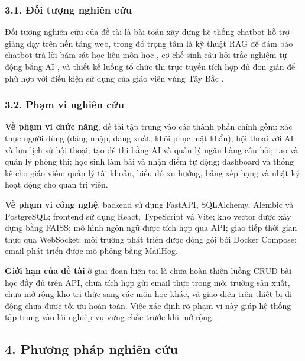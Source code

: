 \documentclass[12pt,a4paper]{article}
\begin{document}
	\subsubsection*{3.1. Đối tượng nghiên cứu}
	
	Đối tượng nghiên cứu của đề tài là bài toán xây dựng hệ thống chatbot hỗ trợ giảng dạy trên nền tảng web, trong đó trọng tâm là kỹ thuật RAG để đảm bảo chatbot trả lời bám sát học liệu môn học \cite{lewis2020rag}, cơ chế sinh câu hỏi trắc nghiệm tự động bằng AI \cite{kurdi2020qg}, và thiết kế luồng tổ chức thi trực tuyến tích hợp đủ đơn giản để phù hợp với điều kiện sử dụng của giáo viên vùng Tây Bắc \cite{gdtd2025}.
	
	\subsubsection*{3.2. Phạm vi nghiên cứu}
	
	\textbf{Về phạm vi chức năng}, đề tài tập trung vào các thành phần chính gồm: xác thực người dùng (đăng nhập, đăng xuất, khôi phục mật khẩu); hội thoại với AI và lưu lịch sử hội thoại; tạo đề thi bằng AI và quản lý ngân hàng câu hỏi; tạo và quản lý phòng thi; học sinh làm bài và nhận điểm tự động; dashboard và thống kê cho giáo viên; quản lý tài khoản, biểu đồ xu hướng, bảng xếp hạng và nhật ký hoạt động cho quản trị viên.
	
	\textbf{Về phạm vi công nghệ}, backend sử dụng FastAPI, SQLAlchemy, Alembic và PostgreSQL; frontend sử dụng React, TypeScript và Vite; kho vector được xây dựng bằng FAISS; mô hình ngôn ngữ được tích hợp qua API; giao tiếp thời gian thực qua WebSocket; môi trường phát triển được đóng gói bởi Docker Compose; email phát triển được mô phỏng bằng MailHog.
	
	\textbf{Giới hạn của đề tài} ở giai đoạn hiện tại là chưa hoàn thiện luồng CRUD bài học đầy đủ trên API, chưa tích hợp gửi email thực trong môi trường sản xuất, chưa mở rộng kho tri thức sang các môn học khác, và giao diện trên thiết bị di động chưa được tối ưu hoàn toàn. Việc xác định rõ phạm vi này giúp hệ thống tập trung vào lõi nghiệp vụ vững chắc trước khi mở rộng.
	
	\subsection*{4. Phương pháp nghiên cứu}
	
\end{document}
